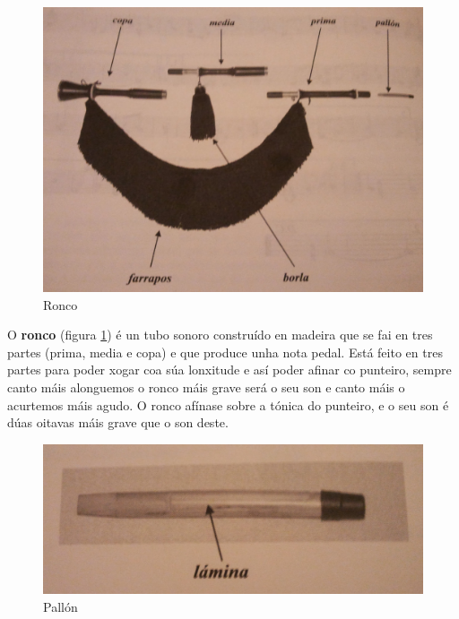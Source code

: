  \begin{figure}[htbp]
  \centering
  \includegraphics[scale=0.1,keepaspectratio=true]{./imagenes/bruno-villamor-ronco.jpg}
  \caption[Ronco]{Ronco \cite{BrunoVillamorCaderno15}}
  \label{figura:BrunoVillamorRonco}
 \end{figure}

 O \textbf{ronco} (figura \ref{figura:BrunoVillamorRonco}) é un tubo sonoro
 construído en madeira que se fai en tres partes (prima, media e copa) e que
 produce unha nota pedal. Está feito en tres partes para poder xogar coa súa
 lonxitude e así poder afinar co punteiro, sempre canto máis alonguemos o ronco
 máis grave será o seu son e canto máis o acurtemos máis agudo. O ronco afínase
 sobre a tónica do punteiro, e o seu son é dúas oitavas máis grave que o son
 deste. \\

 \begin{figure}[htbp]
  \centering
  \includegraphics[scale=0.1,keepaspectratio=true]{./imagenes/bruno-villamor-pallon.jpg}
  \caption[Pallón]{Pallón \cite{BrunoVillamorCaderno15}}
  \label{figura:BrunoVillamorPallon}
 \end{figure}



